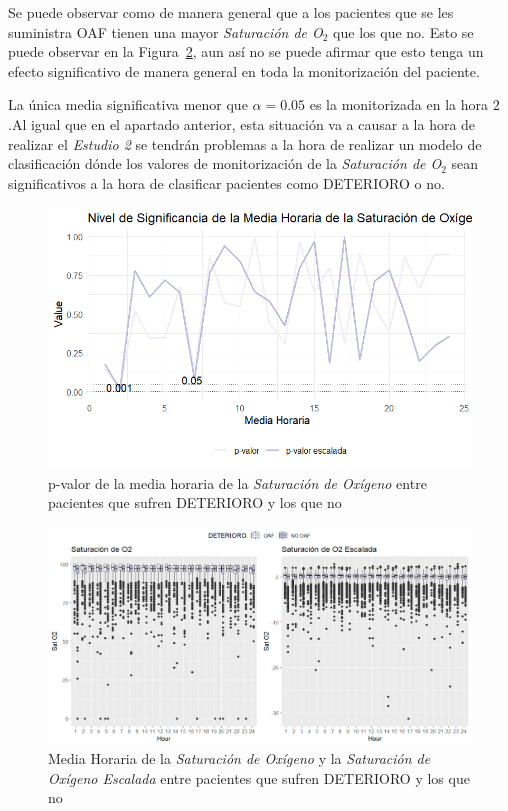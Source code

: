 Se puede observar como de manera general que a los pacientes que se les suministra OAF tienen una mayor \textit{Saturación de O$_2$} que los que no. Esto se puede observar en la Figura~\ref{fig:satO2-boxplot-mean}, aun así no se puede afirmar que esto tenga un efecto significativo de manera general en toda la monitorización del paciente.

La única media significativa menor que $\alpha = 0.05$ es la monitorizada en la hora $2$ .Al igual que en el apartado anterior, esta situación va a causar a la hora de realizar el \textit{Estudio 2} se tendrán problemas a la hora de realizar un modelo de clasificación dónde los valores de monitorización de la \textit{Saturación de O$_2$} sean significativos a la hora de clasificar pacientes como DETERIORO o no.



\begin{figure}[H]
    \centering
    \includegraphics[scale = 1]{./img/mean-SatO2.png}
    \caption{p-valor de la media horaria de la \textit{Saturación de Oxígeno} entre pacientes que sufren DETERIORO y los que no}
    \label{fig:mean-SatO2}
\end{figure}

\newpage
\thispagestyle{empty}
\begin{landscape}
\begin{figure}[H]
    \centering
    \includegraphics[scale = 0.68]{./img/satO2-boxplot-mean.png}
    \caption{Media Horaria de la \textit{Saturación de Oxígeno} y la \textit{Saturación de Oxígeno Escalada} entre pacientes que sufren DETERIORO y los que no}
    \label{fig:satO2-boxplot-mean}
\end{figure}
\end{landscape}
\restoregeometry